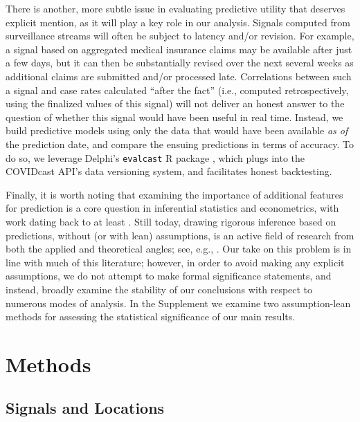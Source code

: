 \documentclass[9pt,twocolumn,twoside,lineno]{pnas-new}
\begin{document}
There is another, more subtle issue in evaluating predictive utility that 
deserves explicit mention, as it will play a key role in our analysis.
Signals computed from surveillance streams will often be subject to  
latency and/or revision. For example, a signal based on aggregated medical
insurance claims may be available after just a few days, but it can then be
substantially revised over the next several weeks as additional claims are
submitted and/or processed late. Correlations between such a signal and case
rates calculated ``after the fact'' (i.e., computed retrospectively, using the
finalized values of this signal) will not deliver an honest answer to the    
question of whether this signal would have been useful in real time. Instead,
we build predictive models using only the data that would have been available
\textit{as of} the prediction date, and compare the ensuing predictions in terms 
of accuracy. To do so, we leverage Delphi's \texttt{evalcast} R package 
\cite{EvalcastR}, which plugs into the COVIDcast API's data versioning system,  
and facilitates honest backtesting. 

Finally, it is worth noting that examining the importance of additional features
for prediction is a core question in inferential statistics and econometrics,
with work dating back to at least \cite{Granger:1969}. Still today, drawing
rigorous inference based on predictions, without (or with lean) assumptions, is
an active field of research from both the applied and theoretical angles;
see, e.g., \cite{Diebold:2002, McCraken:2007, Diebold:2015, Stokes:2017,
  Lei:2018, Rinaldo:2019, Williamsom:2020, Zhang:2020, Dai:2021, Fryer:2021}.
Our take on this problem is in line with much of this literature; however, in
order to avoid making any explicit assumptions, we do not attempt to make formal 
significance statements, and instead, broadly examine the stability of our
conclusions with respect to numerous modes of analysis.
In the Supplement we examine
two assumption-lean
methods for assessing the statistical significance of our main results.

\section{Methods}

\subsection{Signals and Locations}
\end{document}

